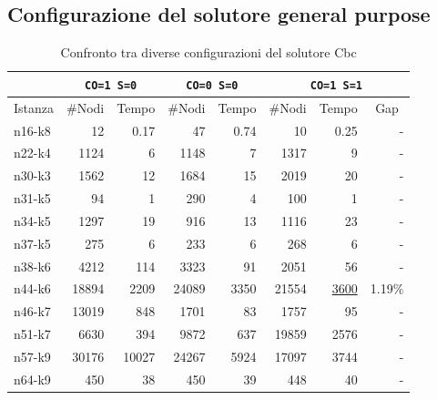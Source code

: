 \documentclass[11pt,oneside,a4paper]{article}
\begin{document}
\subsection{Configurazione del solutore general purpose}
\begin{table}
\begin{tabularx}{\textwidth}{|l|rr|rr|rrr|}
\cline{2-8}

\multicolumn{1}{c|}{} &
\multicolumn{2}{c|}{\tt{CO=1 S=0}} &
\multicolumn{2}{c|}{\tt{CO=0 S=0}} &
\multicolumn{3}{c|}{\tt{CO=1 S=1}} \\

\hline
\multicolumn{1}{|L|}{Istanza} &
\multicolumn{1}{c}{\#Nodi} &
\multicolumn{1}{c|}{Tempo} & 
\multicolumn{1}{c}{\#Nodi} &
\multicolumn{1}{c|}{Tempo} & 
\multicolumn{1}{c}{\#Nodi} &
\multicolumn{1}{c}{Tempo} &
\multicolumn{1}{c|}{Gap} \\

\hline
n16-k8 & 12 & 0.17 
       & 47 & 0.74
       & 10 & 0.25 & -\\
n22-k4 & 1124 & 6  
       & 1148 & 7 
       & 1317 & 9 & -\\
n30-k3 & 1562 & 12 
       & 1684 & 15 
       & 2019 & 20 & -\\
n31-k5 & 94 & 1 
       & 290 & 4 
       & 100 & 1 & -\\
n34-k5 & 1297 & 19 
       & 916 & 13 
       & 1116 & 23 & -\\
n37-k5 & 275 & 6 
       & 233 & 6 
       & 268 & 6 & -\\
n38-k6 & 4212 & 114
       & 3323 & 91 
       & 2051 & 56 & -\\
n44-k6 & 18894 & 2209 
       & 24089 & 3350 
       & 21554 & \underline{3600} & 1.19\% \\
n46-k7 & 13019 & 848 
       & 1701 & 83 
       & 1757 & 95 & -\\
n51-k7 & 6630 & 394 
       & 9872 & 637 
       & 19859 & 2576 & -\\
n57-k9 & 30176 & 10027
       & 24267 & 5924 
       & 17097 & 3744 & -\\
n64-k9 & 450 & 38 
       & 450 & 39
       & 448 & 40 & -\\

\hline

\end{tabularx}
\caption{Confronto tra diverse configurazioni del solutore Cbc}\label{t_var:cbc}
\end{table}
\end{document}
